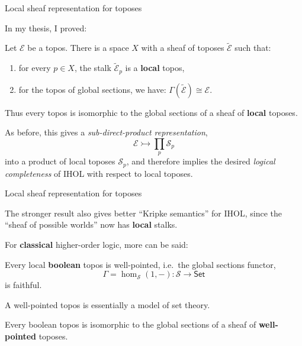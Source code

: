 \documentclass{beamer}
\newcommand{\E}{\ensuremath{\mathcal{E}}}
\newcommand{\myemph}[1]{\textbf{#1}}    %
\newcommand{\Set}{\mathsf{Set}}
\begin{document}
\begin{frame}{Local sheaf representation for toposes}

In my thesis, I proved:

\begin{theorem}[A. 1998]
Let $\E$ be a topos.  
There is a space $X$ with a sheaf of toposes $\tilde{\E}$ such that:
\begin{enumerate}
\item for every $p\in X$, the stalk $\tilde{\E}_p$ is a \myemph{local} topos, 
\item for the topos of global sections, we have: $\Gamma(\tilde{\E}) \cong \E$.
\end{enumerate}
Thus every topos is isomorphic to the global sections of a sheaf of \myemph{local} toposes.  
\end{theorem}
\medskip

As before, this gives a \emph{sub-direct-product representation},
\[
\E \rightarrowtail \prod_{p}\mathcal{S}_p
\]
into a product of local toposes $\mathcal{S}_p$, and therefore implies the desired \emph{logical completeness} of IHOL with respect to local toposes.  
\end{frame}
\begin{frame}{Local sheaf representation for toposes}

The stronger result also gives better ``Kripke semantics'' for IHOL, since the ``sheaf of possible worlds'' now has \myemph{local} stalks.
\medskip

For \myemph{classical} higher-order logic, more can be said:

\begin{lemma}
Every local \myemph{boolean} topos is well-pointed, i.e.\ the global sections functor,
\[
\Gamma = \hom_\mathcal{S}(1, - ) : \mathcal{S} \to \Set
\]
is faithful.
\end{lemma}

A well-pointed topos is essentially a model of set theory.  

\begin{corollary}
Every boolean topos is isomorphic to the global sections of a sheaf of \myemph{well-pointed} toposes.  
\end{corollary}

\end{frame}
\end{document}
